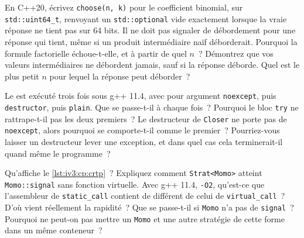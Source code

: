 \begin{question}\label{iq:iv3:cpp:52}
En C++20, écrivez \texttt{choose(n, k)} pour le coefficient binomial, sur \texttt{std::uint64\_t}, renvoyant un \texttt{std::optional} vide exactement lorsque la vraie réponse ne tient pas sur 64 bits. Il ne doit pas signaler de débordement pour une réponse qui tient, même si un produit intermédiaire naïf déborderait. Pourquoi la formule factorielle échoue-t-elle, et à partir de quel $n$~? Démontrez que vos valeurs intermédiaires ne débordent jamais, sauf si la réponse déborde. Quel est le plus petit $n$ pour lequel la réponse peut déborder~?
\end{question}

\begin{question}\label{iq:iv3:cpp:53}
Le  est exécuté trois fois sous g++ 11.4, avec pour argument \texttt{noexcept}, puis \texttt{destructor}, puis \texttt{plain}. Que se passe-t-il à chaque fois~? Pourquoi le bloc \texttt{try} ne rattrape-t-il pas les deux premiers~? Le destructeur de \texttt{Closer} ne porte pas de \texttt{noexcept}, alors pourquoi se comporte-t-il comme le premier~? Pourriez-vous laisser un destructeur lever une exception, et dans quel cas cela terminerait-il quand même le programme~?
\label{lst:iv3:cp:terminate}
\end{question}

\begin{question}\label{iq:iv3:cpp:54}
Qu'affiche le \cref{lst:iv3:cp:crtp}~? Expliquez comment \texttt{Strat<Momo>} atteint \texttt{Momo::signal} sans fonction virtuelle. Avec g++ 11.4, \texttt{-O2}, qu'est-ce que l'assembleur de \texttt{static\_call} contient de différent de celui de \texttt{virtual\_call}~? D'où vient réellement la rapidité~? Que se passe-t-il si \texttt{Momo} n'a pas de \texttt{signal}~? Pourquoi ne peut-on pas mettre un \texttt{Momo} et une autre stratégie de cette forme dans un même conteneur~?
\label{lst:iv3:cp:crtp}
\end{question}

